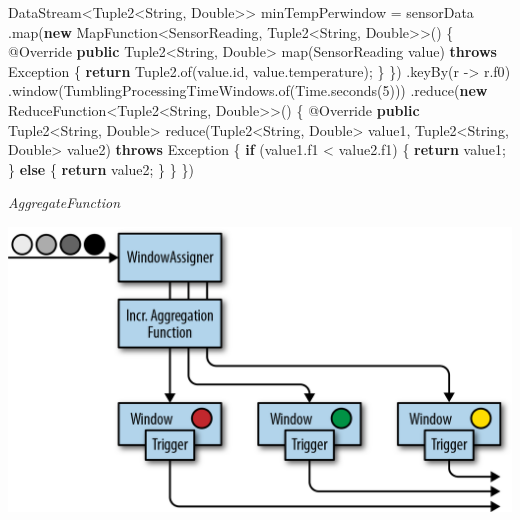 \documentclass[cn,11pt,chinese]{elegantbook}
\newenvironment{Shaded}{}{}
\newcommand{\AttributeTok}[1]{\textcolor[rgb]{0.49,0.56,0.16}{#1}}
\newcommand{\BuiltInTok}[1]{#1}
\newcommand{\DecValTok}[1]{\textcolor[rgb]{0.25,0.63,0.44}{#1}}
\newcommand{\FunctionTok}[1]{\textcolor[rgb]{0.02,0.16,0.49}{#1}}
\newcommand{\KeywordTok}[1]{\textcolor[rgb]{0.00,0.44,0.13}{\textbf{#1}}}
\newcommand{\NormalTok}[1]{#1}
\begin{document}
\begin{Shaded}
\begin{Highlighting}[]
\NormalTok{DataStream\textless{}Tuple2\textless{}}\BuiltInTok{String}\NormalTok{, }\BuiltInTok{Double}\NormalTok{\textgreater{}\textgreater{} minTempPerwindow = sensorData}
\NormalTok{    .}\FunctionTok{map}\NormalTok{(}\KeywordTok{new}\NormalTok{ MapFunction\textless{}SensorReading, Tuple2\textless{}}\BuiltInTok{String}\NormalTok{, }\BuiltInTok{Double}\NormalTok{\textgreater{}\textgreater{}() \{}
        \AttributeTok{@Override}
        \KeywordTok{public}\NormalTok{ Tuple2\textless{}}\BuiltInTok{String}\NormalTok{, }\BuiltInTok{Double}\NormalTok{\textgreater{} }\FunctionTok{map}\NormalTok{(SensorReading value) }\KeywordTok{throws} \BuiltInTok{Exception}\NormalTok{ \{}
            \KeywordTok{return}\NormalTok{ Tuple2.}\FunctionTok{of}\NormalTok{(value.}\FunctionTok{id}\NormalTok{, value.}\FunctionTok{temperature}\NormalTok{);}
\NormalTok{        \}}
\NormalTok{    \})}
\NormalTok{    .}\FunctionTok{keyBy}\NormalTok{(r {-}\textgreater{} r.}\FunctionTok{f0}\NormalTok{)}
\NormalTok{    .}\FunctionTok{window}\NormalTok{(TumblingProcessingTimeWindows.}\FunctionTok{of}\NormalTok{(}\BuiltInTok{Time}\NormalTok{.}\FunctionTok{seconds}\NormalTok{(}\DecValTok{5}\NormalTok{)))}
\NormalTok{    .}\FunctionTok{reduce}\NormalTok{(}\KeywordTok{new}\NormalTok{ ReduceFunction\textless{}Tuple2\textless{}}\BuiltInTok{String}\NormalTok{, }\BuiltInTok{Double}\NormalTok{\textgreater{}\textgreater{}() \{}
        \AttributeTok{@Override}
        \KeywordTok{public}\NormalTok{ Tuple2\textless{}}\BuiltInTok{String}\NormalTok{, }\BuiltInTok{Double}\NormalTok{\textgreater{} }\FunctionTok{reduce}\NormalTok{(Tuple2\textless{}}\BuiltInTok{String}\NormalTok{, }\BuiltInTok{Double}\NormalTok{\textgreater{} value1, Tuple2\textless{}}\BuiltInTok{String}\NormalTok{, }\BuiltInTok{Double}\NormalTok{\textgreater{} value2) }\KeywordTok{throws} \BuiltInTok{Exception}\NormalTok{ \{}
            \KeywordTok{if}\NormalTok{ (value1.}\FunctionTok{f1}\NormalTok{ \textless{} value2.}\FunctionTok{f1}\NormalTok{) \{}
                \KeywordTok{return}\NormalTok{ value1;}
\NormalTok{            \} }\KeywordTok{else}\NormalTok{ \{}
                \KeywordTok{return}\NormalTok{ value2;}
\NormalTok{            \}}
\NormalTok{        \}}
\NormalTok{    \})}
\end{Highlighting}
\end{Shaded}

\emph{AggregateFunction}

\includegraphics{images/spaf_0604.png}
\end{document}
